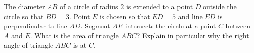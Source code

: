 The diameter $AB$ of a circle of radius $2$ is extended to a point $D$ outside the circle so that $BD=3$. Point $E$ is chosen so that $ED=5$ and line $ED$ is perpendicular to line $AD$. Segment $AE$ intersects the circle at a point $C$ between $A$ and $E$. What is the area of triangle $ABC$? Explain in particular why the right angle of triangle $ABC$ is at $C$.

